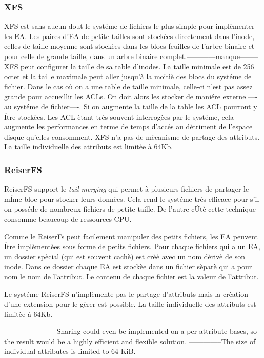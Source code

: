 \subsubsection*{XFS}
XFS est sans aucun dout le systéme de fichiers le plus simple pour implèmenter les EA. Les paires d'EA de petite tailles sont stockèes directement dans l'inode, celles de taille moyenne sont stockèes dans les blocs feuilles de l'arbre binaire et pour celle de grande taille, dans un arbre binaire complet.------------manque--------
XFS peut configurer la taille de sa table d'inodes. La taille minimale est de 256 octet et la taille maximale peut aller jusqu'à la moitiè des blocs du systéme de fichier. Dans le cas où on a une table de taille minimale, celle-ci n'est pas assez grande pour accueillir les ACLs. On doit alors les stocker de maniére externe ----au systéme de fichier----. Si on augmente la taille de la table les ACL pourront y Ítre stockèes. Les ACL ètant trés souvent interrogèes par le systéme, cela augmente les performances en terme de temps d'accés au dètriment de l'espace disque qu'elles consomment.
XFS n'a pas de mècanisme de partage des attributs. La taille individuelle des attributs est limitèe à 64Kb.
 
\subsubsection*{ReiserFS}


ReiserFS support le \emph{tail merging} qui permet à plusieurs fichiers de partager le mÍme bloc pour stocker leurs donnèes. Cela rend le systéme trés efficace pour s'il on posséde de nombreux fichiers de petite taille. De l'autre cÙtè cette technique consomme beaucoup de ressources CPU. 

Comme le ReiserFs peut facilement manipuler des petits fichiers, les EA peuvent Ítre implèmentèes sous forme de petits fichiers. Pour chaque fichiers qui a un EA, un dossier spècial (qui est souvent cachè) est crèè avec un nom dèrivè de son inode. Dans ce dossier chaque EA est stockèe dans un fichier sèparè qui a pour nom le nom de l'attribut. Le contenu de chaque fichier est la valeur de l'attribut.

Le systéme ReiserFS n'implèmente pas le partage d'attributs mais la crèation d'une extension pour le gèrer est possible. La taille individuelle des attributs est limitèe à 64Kb.

----------------------Sharing could even be implemented
on a per-attribute bases, so the result would be
a highly efficient and flexible solution. --------------The size of individual
attributes is limited to 64 KiB.

